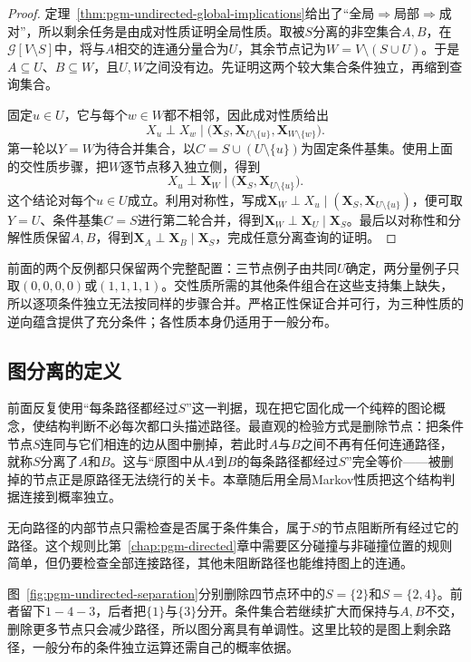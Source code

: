 \begin{proof}
定理~\ref{thm:pgm-undirected-global-implications}给出了“全局$\Rightarrow$局部$\Rightarrow$成对”，所以剩余任务是由成对性质证明全局性质。取被$S$分离的非空集合$A,B$，在$\mathcal{G}[V\setminus S]$中，将与$A$相交的连通分量合为$U$，其余节点记为$W=V\setminus(S\cup U)$。于是$A\subseteq U$、$B\subseteq W$，且$U,W$之间没有边。先证明这两个较大集合条件独立，再缩到查询集合。

固定$u\in U$，它与每个$w\in W$都不相邻，因此成对性质给出
\[
  X_u\perp X_w
  \mid
  \bigl(\bm{X}_S,\bm{X}_{U\setminus\{u\}},
        \bm{X}_{W\setminus\{w\}}\bigr).
\]
第一轮以$Y=W$为待合并集合，以$C=S\cup(U\setminus\{u\})$为固定条件基集。使用上面的交性质步骤，把$W$逐节点移入独立侧，得到
\[
  X_u\perp\bm{X}_W
  \mid\bigl(\bm{X}_S,\bm{X}_{U\setminus\{u\}}\bigr).
\]
这个结论对每个$u\in U$成立。利用对称性，写成$\bm{X}_W\perp X_u\mid(\bm{X}_S,\bm{X}_{U\setminus\{u\}})$，便可取$Y=U$、条件基集$C=S$进行第二轮合并，得到$\bm{X}_W\perp\bm{X}_U\mid\bm{X}_S$。最后以对称性和分解性质保留$A,B$，得到$\bm{X}_A\perp\bm{X}_B\mid\bm{X}_S$，完成任意分离查询的证明。
\end{proof}

前面的两个反例都只保留两个完整配置：三节点例子由共同$U$确定，两分量例子只取$(0,0,0,0)$或$(1,1,1,1)$。交性质所需的其他条件组合在这些支持集上缺失，所以逐项条件独立无法按同样的步骤合并。严格正性保证合并可行，为三种性质的逆向蕴含提供了充分条件；各性质本身仍适用于一般分布。

\subsection{图分离的定义}
\label{sec:pgm-undirected-separation}

前面反复使用“每条路径都经过$S$”这一判据，现在把它固化成一个纯粹的图论概念，使结构判断不必每次都口头描述路径。最直观的检验方式是删除节点：把条件节点$S$连同与它们相连的边从图中删掉，若此时$A$与$B$之间不再有任何连通路径，就称$S$分离了$A$和$B$。这与“原图中从$A$到$B$的每条路径都经过$S$”完全等价——被删掉的节点正是原路径无法绕行的关卡。本章随后用全局Markov性质把这个结构判据连接到概率独立。

无向路径的内部节点只需检查是否属于条件集合，属于$S$的节点阻断所有经过它的路径。这个规则比第~\ref{chap:pgm-directed}章中需要区分碰撞与非碰撞位置的规则简单，但仍要检查全部连接路径，其他未阻断路径也能维持图上的连通。

图~\ref{fig:pgm-undirected-separation}分别删除四节点环中的$S=\{2\}$和$S=\{2,4\}$。前者留下$1-4-3$，后者把$\{1\}$与$\{3\}$分开。条件集合若继续扩大而保持与$A,B$不交，删除更多节点只会减少路径，所以图分离具有单调性。这里比较的是图上剩余路径，一般分布的条件独立运算还需自己的概率依据。

